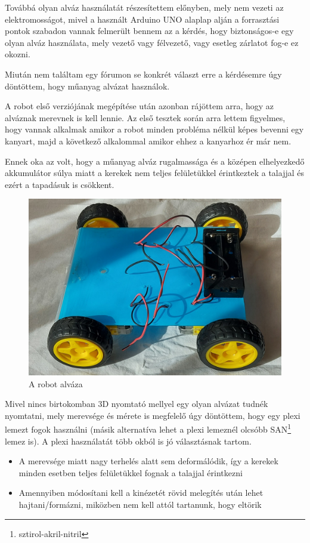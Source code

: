 \documentclass[]{thesis-ekf}
\theoremstyle{definition}
\begin{document}
Továbbá olyan alváz használatát részesítettem előnyben, mely nem vezeti az elektromosságot, mivel a használt Arduino UNO alaplap alján a forrasztási pontok szabadon vannak felmerült bennem az a kérdés, hogy biztonságos-e egy olyan alváz használata, mely vezető vagy félvezető, vagy esetleg zárlatot fog-e ez okozni.

Miután nem találtam egy fórumon se konkrét választ erre a kérdésemre úgy döntöttem, hogy műanyag alvázat használok.

A robot első verziójának megépítése után azonban rájöttem arra, hogy az alváznak merevnek is kell lennie. Az első tesztek során arra lettem figyelmes, hogy vannak alkalmak amikor a robot minden probléma nélkül képes bevenni egy kanyart, majd a következő alkalommal amikor ehhez a kanyarhoz ér már nem.

Ennek oka az volt, hogy a műanyag alváz rugalmassága és a középen elhelyezkedő akkumulátor súlya miatt a kerekek nem teljes felületükkel érintkeztek a talajjal és ezért a tapadásuk is csökkent.
\begin{figure}[h]
	\centering
	\includegraphics[width=0.85\linewidth]{images/robot_build/robot_base}
	\caption{A robot alváza}
	\label{alváz}
\end{figure}

Mivel nincs birtokomban 3D nyomtató mellyel egy olyan alvázat tudnék nyomtatni, mely merevsége és mérete is megfelelő úgy döntöttem, hogy egy plexi lemezt fogok használni (másik alternatíva lehet a plexi lemeznél olcsóbb SAN\footnote{sztirol-akril-nitril} lemez is). A plexi használatát több okból is jó választásnak tartom.
\begin{itemize}
	\item A merevsége miatt nagy terhelés alatt sem deformálódik, így a kerekek minden esetben teljes felületükkel fognak a talajjal érintkezni
	\item Amennyiben módosítani kell a kinézetét rövid melegítés után lehet hajtani/formázni, miközben nem kell attól tartanunk, hogy eltörik
\end{itemize}
\end{document}
